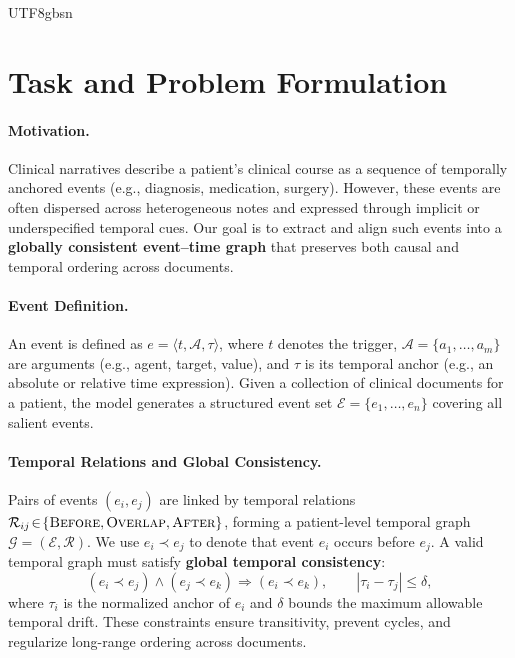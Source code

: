 \documentclass[11pt]{article}
\begin{document}
\begin{CJK*}{UTF8}{gbsn}
\section{Task and Problem Formulation}
\label{sec:task}

\paragraph{Motivation.}
Clinical narratives describe a patient's clinical course as a sequence of temporally anchored events (e.g., diagnosis, medication, surgery). However, these events are often dispersed across heterogeneous notes and expressed through implicit or underspecified temporal cues. Our goal is to extract and align such events into a \textbf{globally consistent event--time graph} that preserves both causal and temporal ordering across documents.

\paragraph{Event Definition.}
An event is defined as $e=\langle t,\mathcal{A},\tau\rangle$, where $t$ denotes the trigger, $\mathcal{A}=\{a_1,\dots,a_m\}$ are arguments (e.g., agent, target, value), and $\tau$ is its temporal anchor (e.g., an absolute or relative time expression). Given a collection of clinical documents for a patient, the model generates a structured event set $\mathcal{E}=\{e_1,\dots,e_n\}$ covering all salient events.

\paragraph{Temporal Relations and Global Consistency.}
Pairs of events $(e_i,e_j)$ are linked by temporal relations $\mathcal{R}_{ij}\!\in\!\{\textsc{Before},\textsc{Overlap},\textsc{After}\}$, forming a patient-level temporal graph $\mathcal{G}=(\mathcal{E},\mathcal{R})$. We use $e_i\!\prec\!e_j$ to denote that event $e_i$ occurs before $e_j$. A valid temporal graph must satisfy \textbf{global temporal consistency}:
\begin{equation}
\label{eq:consistency}
(e_i\!\prec\!e_j)\!\land\!(e_j\!\prec\!e_k) \Rightarrow(e_i\!\prec\!e_k), \qquad |\tau_i-\tau_j|\le\delta,
\end{equation}
where $\tau_i$ is the normalized anchor of $e_i$ and $\delta$ bounds the maximum allowable temporal drift. These constraints ensure transitivity, prevent cycles, and regularize long-range ordering across documents.


\end{CJK*}
\end{document}

